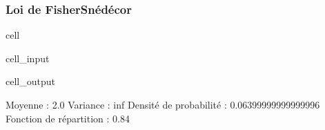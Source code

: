 \documentclass[letterpaper,10pt,english]{jupyterBook}
\begin{document}
\subsubsection{Loi de Fisher\sphinxhyphen{}Snédécor}
\label{\detokenize{elemstats:loi-de-fisher-snedecor}}
\begin{sphinxuseclass}{cell}\begin{sphinxVerbatimInput}

\begin{sphinxuseclass}{cell_input}
\begin{sphinxVerbatim}[commandchars=\\\{\}]
   
  
    
  
 
 
 
\end{sphinxVerbatim}

\end{sphinxuseclass}\end{sphinxVerbatimInput}
\begin{sphinxVerbatimOutput}

\begin{sphinxuseclass}{cell_output}
\begin{sphinxVerbatim}[commandchars=\\\{\}]
Moyenne :  2.0
Variance :  inf
Densité de probabilité :  0.06399999999999996
Fonction de répartition :  0.84
\end{sphinxVerbatim}

\end{sphinxuseclass}\end{sphinxVerbatimOutput}

\end{sphinxuseclass}
\end{document}
